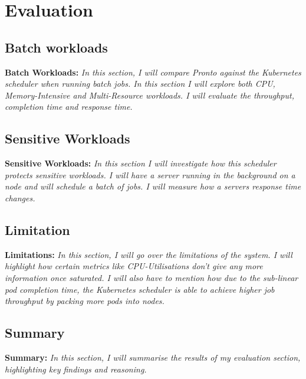 \chapter{Evaluation}
%

\section{Batch workloads}
\begin{tcolorbox}[boxsep=0mm,left=2.5mm,right=2.5mm]
    \textbf{Batch Workloads:} {\em In this section, I will compare Pronto
    against the Kubernetes scheduler when running batch jobs. In this section I
    will explore both CPU, Memory-Intensive and Multi-Resource workloads. I will
    evaluate the throughput, completion time and response time.}
\end{tcolorbox}

\section{Sensitive Workloads}
\begin{tcolorbox}[boxsep=0mm,left=2.5mm,right=2.5mm]
    \textbf{Sensitive Workloads:} {\em In this section I will investigate how
    this scheduler protects sensitive workloads. I will have a server running in
    the background on a node and will schedule a batch of jobs. I will measure
    how a servers response time changes.}
\end{tcolorbox}

\section{Limitation}
\begin{tcolorbox}[boxsep=0mm,left=2.5mm,right=2.5mm]
    \textbf{Limitations:} {\em In this section, I will go over the limitations
    of the system. I will highlight how certain metrics like CPU-Utilisations
    don't give any more information once saturated. I will also have to mention
    how due to the sub-linear pod completion time, the Kubernetes scheduler is
    able to achieve higher job throughput by packing more pods into nodes.
    }
\end{tcolorbox}

\section{Summary}
\begin{tcolorbox}[boxsep=0mm,left=2.5mm,right=2.5mm]
    \textbf{Summary:} {\em In this section, I will summarise the results of my
    evaluation section, highlighting key findings and reasoning.
    }
\end{tcolorbox}

